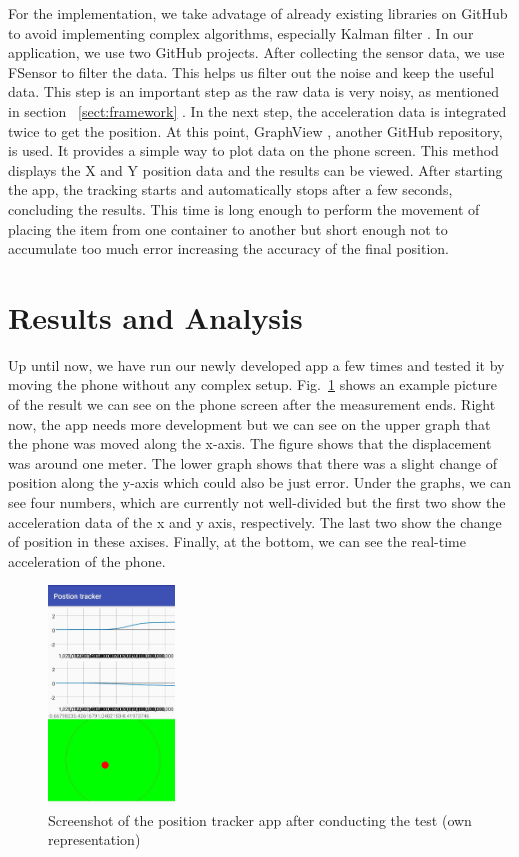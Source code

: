 \documentclass[12pt,twoside, hidelinks]{article}
\begin{document}
 For the implementation, we  take advatage of already existing libraries on GitHub to avoid implementing complex algorithms, especially Kalman filter \cite{Kalman_filter_book}. In our application, we use two GitHub \cite{github} projects. After collecting the sensor data, we use FSensor \cite{KalebKE_2018} to filter the data. This helps us filter out the noise and keep the useful data. This step is an important step as the raw data is very noisy, as mentioned in section ~\ref{sect:framework} . In the next step, the acceleration data is integrated twice to get the position. At this point, GraphView \cite{Graphview}, another GitHub repository, is used. It provides a simple way to plot data on the phone screen. This method displays the X and Y position data and the results can be viewed. After starting the app, the tracking starts and automatically stops after a few seconds, concluding the results. This time is long enough to perform the movement of placing the item from one container to another but short enough not to accumulate too much error increasing the accuracy of the final position.

\section{Results and Analysis}
\label{sec:results}

Up until now, we have run our newly developed app a few times and tested it by moving the phone without any complex setup. Fig.~\ref{fig:app1} shows an example picture of the result we can see on the phone screen after the measurement ends. Right now, the app needs more development but we can see on the upper graph that the phone was moved along the x-axis. The figure shows that the displacement was around one meter. The lower graph shows that there was a slight change of position along the y-axis which could also be just error. Under the graphs, we can see four numbers, which are currently not well-divided but the first two show the acceleration data of the x and y axis, respectively. The last two show the change of position in these axises. Finally, at the bottom, we can see the real-time acceleration of the phone.
\begin{figure}[H]
	\begin{center}
		\includegraphics[width=0.3\textwidth]{figures/app1}
		\caption{Screenshot of the position tracker app after conducting the test (own representation)}
		\label{fig:app1}
	\end{center}
\end{figure}
\end{document}

